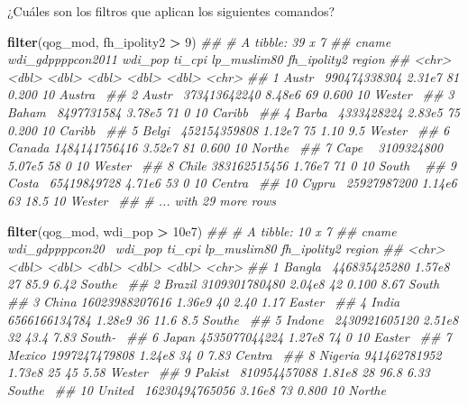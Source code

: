 \documentclass[]{book}
\newenvironment{Shaded}{\begin{snugshade}}{\end{snugshade}}
\newcommand{\CommentTok}[1]{\textcolor[rgb]{0.56,0.35,0.01}{\textit{#1}}}
\newcommand{\DecValTok}[1]{\textcolor[rgb]{0.00,0.00,0.81}{#1}}
\newcommand{\FloatTok}[1]{\textcolor[rgb]{0.00,0.00,0.81}{#1}}
\newcommand{\KeywordTok}[1]{\textcolor[rgb]{0.13,0.29,0.53}{\textbf{#1}}}
\newcommand{\NormalTok}[1]{#1}
\newcommand{\OperatorTok}[1]{\textcolor[rgb]{0.81,0.36,0.00}{\textbf{#1}}}
\newcommand{\StringTok}[1]{\textcolor[rgb]{0.31,0.60,0.02}{#1}}
\begin{document}
¿Cuáles son los filtros que aplican los siguientes comandos?

\begin{Shaded}
\begin{Highlighting}[]
\KeywordTok{filter}\NormalTok{(qog_mod, fh_ipolity2 }\OperatorTok{>}\StringTok{ }\DecValTok{9}\NormalTok{)}
\CommentTok{## # A tibble: 39 x 7}
\CommentTok{##    cname  wdi_gdppppcon2011 wdi_pop ti_cpi lp_muslim80 fh_ipolity2 region }
\CommentTok{##    <chr>              <dbl>   <dbl>  <dbl>       <dbl>       <dbl> <chr>  }
\CommentTok{##  1 Austr~      990474338304  2.31e7     81       0.200        10   Austra~}
\CommentTok{##  2 Austr~      373413642240  8.48e6     69       0.600        10   Wester~}
\CommentTok{##  3 Baham~        8497731584  3.78e5     71       0            10   Caribb~}
\CommentTok{##  4 Barba~        4333428224  2.83e5     75       0.200        10   Caribb~}
\CommentTok{##  5 Belgi~      452154359808  1.12e7     75       1.10          9.5 Wester~}
\CommentTok{##  6 Canada     1484141756416  3.52e7     81       0.600        10   Northe~}
\CommentTok{##  7 Cape ~        3109324800  5.07e5     58       0            10   Wester~}
\CommentTok{##  8 Chile       383162515456  1.76e7     71       0            10   South ~}
\CommentTok{##  9 Costa~       65419849728  4.71e6     53       0            10   Centra~}
\CommentTok{## 10 Cypru~       25927987200  1.14e6     63      18.5          10   Wester~}
\CommentTok{## # ... with 29 more rows}

\KeywordTok{filter}\NormalTok{(qog_mod, wdi_pop }\OperatorTok{>}\StringTok{ }\FloatTok{10e7}\NormalTok{)}
\CommentTok{## # A tibble: 10 x 7}
\CommentTok{##    cname   wdi_gdppppcon20~ wdi_pop ti_cpi lp_muslim80 fh_ipolity2 region }
\CommentTok{##    <chr>              <dbl>   <dbl>  <dbl>       <dbl>       <dbl> <chr>  }
\CommentTok{##  1 Bangla~     446835425280  1.57e8     27      85.9          6.42 Southe~}
\CommentTok{##  2 Brazil     3109301780480  2.04e8     42       0.100        8.67 South ~}
\CommentTok{##  3 China     16023988207616  1.36e9     40       2.40         1.17 Easter~}
\CommentTok{##  4 India      6566166134784  1.28e9     36      11.6          8.5  Southe~}
\CommentTok{##  5 Indone~    2430921605120  2.51e8     32      43.4          7.83 South-~}
\CommentTok{##  6 Japan      4535077044224  1.27e8     74       0           10    Easter~}
\CommentTok{##  7 Mexico     1997247479808  1.24e8     34       0            7.83 Centra~}
\CommentTok{##  8 Nigeria     941462781952  1.73e8     25      45            5.58 Wester~}
\CommentTok{##  9 Pakist~     810954457088  1.81e8     28      96.8          6.33 Southe~}
\CommentTok{## 10 United~   16230494765056  3.16e8     73       0.800       10    Northe~}


\end{Highlighting}
\end{Shaded}
\end{document}
